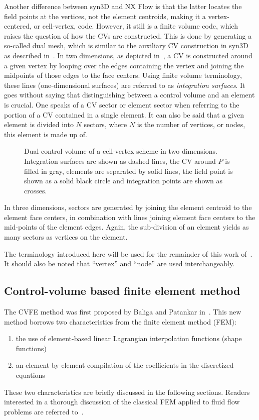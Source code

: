 Another difference between syn3D and NX Flow is that the latter locates the field points at the vertices, not the element centroids, making it a vertex-centered, or cell-vertex, code. However, it still is a finite volume code, which raises the question of how the CVs are constructed. This is done by generating a so-called dual mesh, which is similar to the auxiliary CV construction in syn3D as described in~. In two dimensions, as depicted in~, a CV is constructed around a given vertex by looping over the edges containing the vertex and joining the midpoints of those edges to the face centers. Using finite volume terminology, these lines (one-dimensional surfaces) are referred to as \textit{integration surfaces}. It goes without saying that distinguishing between a control volume and an element is crucial. One speaks of a CV sector or element sector when referring to the portion of a CV contained in a single element. It can also be said that a given element is divided into $N$ sectors, where $N$ is the number of vertices, or nodes, this element is made up of.
\begin{figure}
    \centering
    \begin{tikzpicture}[scale=3.5]
    \end{tikzpicture}
    \caption{Dual control volume of a cell-vertex scheme in two dimensions. Integration surfaces are shown as dashed lines, the CV around $P$ is filled in gray, elements are separated by solid lines, the field point is shown as a solid black circle and integration points are shown as crosses.}
    \label{fig:dualmeshtwo}
\end{figure}

In three dimensions, sectors are generated by joining the element centroid to the element face centers, in combination with lines joining element face centers to the mid-points of the element edges. Again, the sub-division of an element yields as many sectors as vertices on the element.

The terminology introduced here will be used for the remainder of this work of~. It should also be noted that ``vertex'' and ``node'' are used interchangeably.

\subsection{Control-volume based finite element method}
\label{sec:cvfem}
%
The CVFE method was first proposed by Baliga and Patankar in~\cite{baliga1980new,baliga1983control}. This new method borrows two characteristics from the finite element method (FEM):
\begin{enumerate}
    \item the use of element-based linear Lagrangian interpolation functions (shape functions)
    \item an element-by-element compilation of the coefficients in the discretized equations
\end{enumerate}
These two characteristics are briefly discussed in the following sections. Readers interested in a thorough discussion of the classical FEM applied to fluid flow problems are referred to~\cite{reddy2000finite}.

